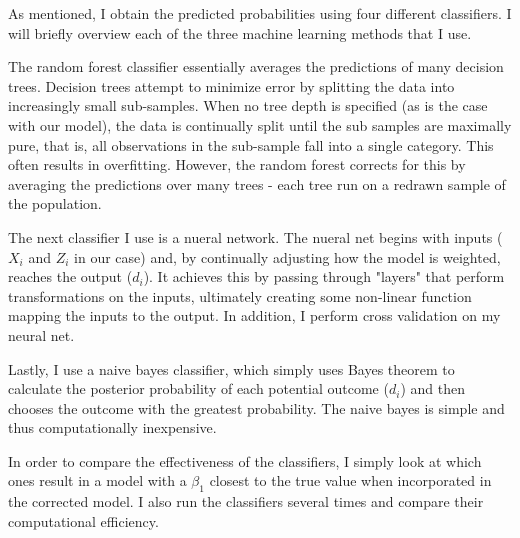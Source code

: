 \documentclass[12pt,english]{article}
\begin{document}
\par
As mentioned, I obtain the predicted probabilities using four different classifiers. I will briefly overview each of the three machine learning methods that I use.
\par
The random forest classifier essentially averages the predictions of many decision trees. Decision trees attempt to minimize error by splitting the data into increasingly small sub-samples. When no tree depth is specified (as is the case with our model), the data is continually split until the sub samples are maximally pure, that is, all observations in the sub-sample fall into a single category. This often results in overfitting. However, the random forest corrects for this by averaging the predictions over many trees - each tree run on a redrawn sample of the population.
\par
The next classifier I use is a nueral network. The nueral net begins with inputs ($X_i$ and $Z_i$ in our case) and, by continually adjusting how the model is weighted, reaches the output ($d_i$). It achieves this by passing through "layers" that perform transformations on the inputs, ultimately creating some non-linear function mapping the inputs to the output. In addition, I perform cross validation on my neural net.
\par
Lastly, I use a naive bayes classifier, which simply uses Bayes theorem to calculate the posterior probability of each potential outcome ($d_i$) and then chooses the outcome with the greatest probability. The naive bayes is simple and thus computationally inexpensive.
\par
In order to compare the effectiveness of the classifiers, I simply look at which ones result in a model with a $\beta_1$ closest to the true value when incorporated in the corrected model. I also run the classifiers several times and compare their computational efficiency.
\end{document}

